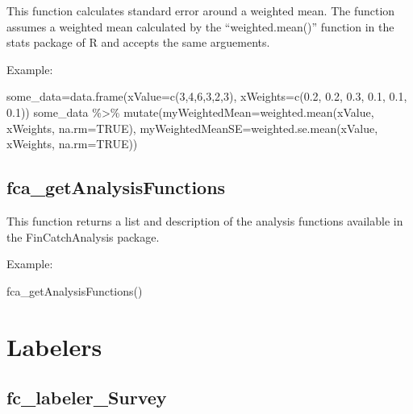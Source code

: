 \documentclass[
  letterpaper,
  DIV=11,
  numbers=noendperiod]{scrreprt}
\newenvironment{Shaded}{\begin{snugshade}}{\end{snugshade}}
\newcommand{\AttributeTok}[1]{\textcolor[rgb]{0.40,0.45,0.13}{#1}}
\newcommand{\ConstantTok}[1]{\textcolor[rgb]{0.56,0.35,0.01}{#1}}
\newcommand{\DecValTok}[1]{\textcolor[rgb]{0.68,0.00,0.00}{#1}}
\newcommand{\FloatTok}[1]{\textcolor[rgb]{0.68,0.00,0.00}{#1}}
\newcommand{\FunctionTok}[1]{\textcolor[rgb]{0.28,0.35,0.67}{#1}}
\newcommand{\NormalTok}[1]{\textcolor[rgb]{0.00,0.23,0.31}{#1}}
\newcommand{\OtherTok}[1]{\textcolor[rgb]{0.00,0.23,0.31}{#1}}
\newcommand{\SpecialCharTok}[1]{\textcolor[rgb]{0.37,0.37,0.37}{#1}}
\begin{document}
This function calculates standard error around a weighted mean. The
function assumes a weighted mean calculated by the ``weighted.mean()''
function in the stats package of R and accepts the same arguements.

Example:

\begin{Shaded}
\begin{Highlighting}[]
\NormalTok{some\_data}\OtherTok{=}\FunctionTok{data.frame}\NormalTok{(}\AttributeTok{xValue=}\FunctionTok{c}\NormalTok{(}\DecValTok{3}\NormalTok{,}\DecValTok{4}\NormalTok{,}\DecValTok{6}\NormalTok{,}\DecValTok{3}\NormalTok{,}\DecValTok{2}\NormalTok{,}\DecValTok{3}\NormalTok{),}
                     \AttributeTok{xWeights=}\FunctionTok{c}\NormalTok{(}\FloatTok{0.2}\NormalTok{, }\FloatTok{0.2}\NormalTok{, }\FloatTok{0.3}\NormalTok{, }\FloatTok{0.1}\NormalTok{, }\FloatTok{0.1}\NormalTok{, }\FloatTok{0.1}\NormalTok{))}
\NormalTok{some\_data }\SpecialCharTok{\%\textgreater{}\%}
  \FunctionTok{mutate}\NormalTok{(}\AttributeTok{myWeightedMean=}\FunctionTok{weighted.mean}\NormalTok{(xValue, xWeights, }\AttributeTok{na.rm=}\ConstantTok{TRUE}\NormalTok{),}
         \AttributeTok{myWeightedMeanSE=}\FunctionTok{weighted.se.mean}\NormalTok{(xValue, xWeights, }\AttributeTok{na.rm=}\ConstantTok{TRUE}\NormalTok{))}
\end{Highlighting}
\end{Shaded}

\subsection{fca\_getAnalysisFunctions}\label{fca_getanalysisfunctions}

This function returns a list and description of the analysis functions
available in the FinCatchAnalysis package.

Example:

\begin{Shaded}
\begin{Highlighting}[]
\FunctionTok{fca\_getAnalysisFunctions}\NormalTok{()}
\end{Highlighting}
\end{Shaded}

\section{Labelers}\label{labelers}

\subsection{fc\_labeler\_Survey}\label{fc_labeler_survey}
\end{document}
